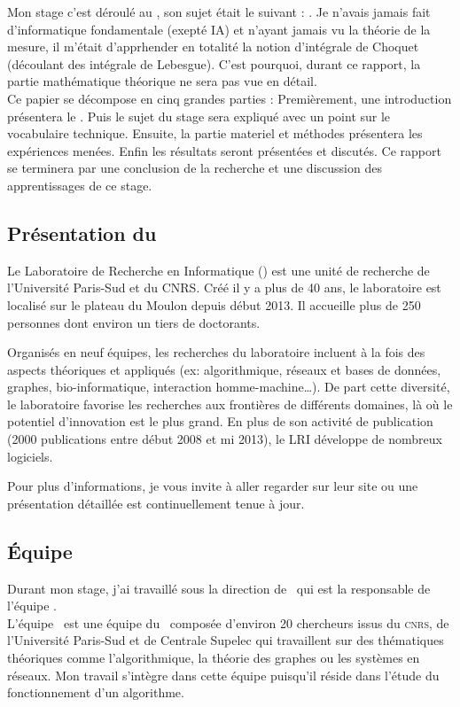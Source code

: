
Mon stage c'est déroulé au \Lri, son sujet était le suivant : \textit{\sujet}.
Je n'avais jamais fait d'informatique fondamentale (exepté IA)
et n'ayant jamais vu la théorie de la mesure,
il m'était d'apprhender en totalité la notion d'intégrale de Choquet (découlant des intégrale de Lebesgue).
C'est pourquoi, durant ce rapport, la partie mathématique théorique ne sera pas vue en détail.\\


Ce papier se décompose en cinq grandes parties :
Premièrement, une introduction présentera le \lri.
Puis le sujet du stage sera expliqué avec un point sur le vocabulaire technique.
Ensuite, la partie materiel et méthodes présentera les expériences menées.
Enfin les résultats seront présentées et discutés.
Ce rapport se terminera par une conclusion de la recherche et une discussion des apprentissages de ce stage.


\subsection{Présentation du \lri}\label{subsec:pglri}
Le Laboratoire de Recherche en Informatique (\lri) est une unité de recherche de l'Université
Paris-Sud et du \textsc{CNRS}.
Créé il y a plus de 40 ans, le laboratoire est localisé sur le plateau du Moulon depuis début 2013.
Il accueille plus de 250 personnes dont environ un tiers de doctorants.


Organisés en neuf équipes, les recherches du laboratoire incluent à la fois des aspects théoriques et appliqués
(ex: algorithmique, réseaux et bases de données, graphes, bio-informatique, interaction homme-machine\ldots).
De part cette diversité, le laboratoire favorise les recherches aux frontières de différents domaines,
là où le potentiel d'innovation est le plus grand.
En plus de son activité de publication (2000 publications entre début 2008 et mi 2013),
le LRI développe de nombreux logiciels.


Pour plus d'informations, je vous invite à aller regarder sur leur site
ou une présentation détaillée est continuellement tenue à jour\cite{LRI}.


\subsection{Équipe \galac}\label{subsec:galac}
Durant mon stage, j'ai travaillé sous la direction de \johanne\ qui est la responsable de l'équipe \galac. \\
L'équipe \galac\ est une équipe du \lri\ composée d'environ 20 chercheurs issus du \textsc{cnrs}, de l'Université
Paris-Sud et de Centrale Supelec qui travaillent sur des thématiques théoriques comme
l'algorithmique, la théorie des graphes ou les systèmes en réseaux.
Mon travail s'intègre dans cette équipe puisqu'il réside dans l'étude du fonctionnement d'un algorithme.
